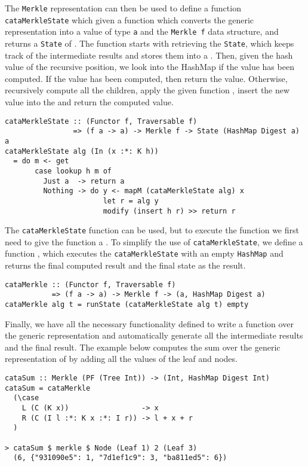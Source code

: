 The \texttt{Merkle} representation can then be used to define a function \texttt{cataMerkleState} which given a function  which converts the generic representation  into a value of type \texttt{a} and the \texttt{Merkle f} data structure, and returns a \texttt{State} of . The  function starts with retrieving the \texttt{State}, which keeps track of the intermediate results and stores them into a . Then, given the hash value of the recursive position, we look into the HashMap if the value has been computed. If the value has been computed, then return the value. Otherwise, recursively compute all the children, apply the given function , insert the new value into the  and return the computed value.

\begin{verbatim}
cataMerkleState :: (Functor f, Traversable f)
                => (f a -> a) -> Merkle f -> State (HashMap Digest a) a
cataMerkleState alg (In (x :*: K h)) 
  = do m <- get
       case lookup h m of
         Just a  -> return a
         Nothing -> do y <- mapM (cataMerkleState alg) x
                       let r = alg y
                       modify (insert h r) >> return r
\end{verbatim}

The \texttt{cataMerkleState} function can be used, but to execute the function we first need to give the function a . To simplify the use of \texttt{cataMerkleState}, we define a function , which executes the \texttt{cataMerkleState} with an empty \texttt{HashMap} and returns the final computed result and the final state as the result. 

\begin{verbatim}
cataMerkle :: (Functor f, Traversable f)
           => (f a -> a) -> Merkle f -> (a, HashMap Digest a)
cataMerkle alg t = runState (cataMerkleState alg t) empty
\end{verbatim}

Finally, we have all the necessary functionality defined to write a function over the generic representation and automatically generate all the intermediate results and the final result. The example below computes the sum over the generic representation of  by adding all the values of the leaf and nodes. 

\begin{verbatim}
cataSum :: Merkle (PF (Tree Int)) -> (Int, HashMap Digest Int)
cataSum = cataMerkle
  (\case
    L (C (K x))                 -> x
    R (C (I l :*: K x :*: I r)) -> l + x + r
  )

> cataSum $ merkle $ Node (Leaf 1) 2 (Leaf 3)
  (6, {"931090e5": 1, "7d1ef1c9": 3, "ba811ed5": 6})
\end{verbatim}

